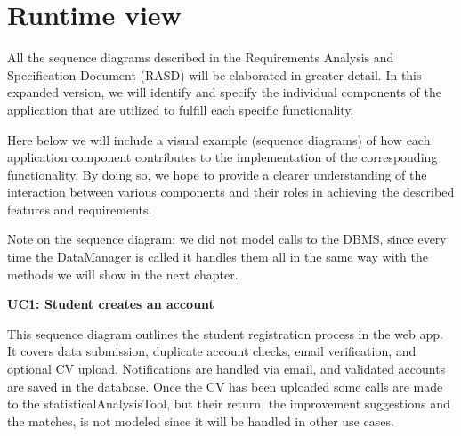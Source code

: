 \pagebreak
\section{Runtime view}

All the sequence diagrams described in the Requirements Analysis and Specification Document (RASD) will be elaborated in greater detail. In this expanded version, we will identify and specify the individual components of the application that are utilized to fulfill each specific functionality. 

Here below we will include a visual example (sequence diagrams) of how each application component contributes to the implementation of the corresponding functionality. By doing so, we hope to provide a clearer understanding of the interaction between various components and their roles in achieving the described features and requirements.

Note on the sequence diagram: we did not model calls to the DBMS, since every time the DataManager is called it handles them all in the same way with the methods we will show in the next chapter.

\textbf{UC1: Student creates an account}

This sequence diagram outlines the student registration process in the web app. It covers data submission, duplicate account checks, email verification, and optional CV upload. Notifications are handled via email, and validated accounts are saved in the database. Once the CV has been uploaded some calls are made to the statisticalAnalysisTool, but their return, the improvement suggestions and the matches, is not modeled since it will be handled in other use cases.



